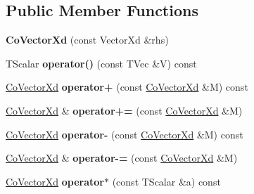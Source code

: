 \subsection*{Public Member Functions}
\begin{DoxyCompactItemize}
\item 
\hypertarget{struct_d_r_d_s_p_1_1_co_vector_xd_a1d667a92798aeb3cc7b41ef66651d6f1}{{\bfseries Co\-Vector\-Xd} (const Vector\-Xd \&rhs)}\label{struct_d_r_d_s_p_1_1_co_vector_xd_a1d667a92798aeb3cc7b41ef66651d6f1}

\item 
\hypertarget{struct_d_r_d_s_p_1_1_co_vector_xd_ab304698fb26798dcd9460a85a6bcc9f7}{T\-Scalar {\bfseries operator()} (const T\-Vec \&V) const }\label{struct_d_r_d_s_p_1_1_co_vector_xd_ab304698fb26798dcd9460a85a6bcc9f7}

\item 
\hypertarget{struct_d_r_d_s_p_1_1_co_vector_xd_ae9dd77d633e38cdae84184a43c767bb3}{\hyperlink{struct_d_r_d_s_p_1_1_co_vector_xd}{Co\-Vector\-Xd} {\bfseries operator+} (const \hyperlink{struct_d_r_d_s_p_1_1_co_vector_xd}{Co\-Vector\-Xd} \&M) const }\label{struct_d_r_d_s_p_1_1_co_vector_xd_ae9dd77d633e38cdae84184a43c767bb3}

\item 
\hypertarget{struct_d_r_d_s_p_1_1_co_vector_xd_a2faad7b1946d7865d18e33bb1fb428af}{\hyperlink{struct_d_r_d_s_p_1_1_co_vector_xd}{Co\-Vector\-Xd} \& {\bfseries operator+=} (const \hyperlink{struct_d_r_d_s_p_1_1_co_vector_xd}{Co\-Vector\-Xd} \&M)}\label{struct_d_r_d_s_p_1_1_co_vector_xd_a2faad7b1946d7865d18e33bb1fb428af}

\item 
\hypertarget{struct_d_r_d_s_p_1_1_co_vector_xd_abcd5f800b05247ba663358387f0250fe}{\hyperlink{struct_d_r_d_s_p_1_1_co_vector_xd}{Co\-Vector\-Xd} {\bfseries operator-\/} (const \hyperlink{struct_d_r_d_s_p_1_1_co_vector_xd}{Co\-Vector\-Xd} \&M) const }\label{struct_d_r_d_s_p_1_1_co_vector_xd_abcd5f800b05247ba663358387f0250fe}

\item 
\hypertarget{struct_d_r_d_s_p_1_1_co_vector_xd_a9e15856f1b9498956ac0baa8c695bd77}{\hyperlink{struct_d_r_d_s_p_1_1_co_vector_xd}{Co\-Vector\-Xd} \& {\bfseries operator-\/=} (const \hyperlink{struct_d_r_d_s_p_1_1_co_vector_xd}{Co\-Vector\-Xd} \&M)}\label{struct_d_r_d_s_p_1_1_co_vector_xd_a9e15856f1b9498956ac0baa8c695bd77}

\item 
\hypertarget{struct_d_r_d_s_p_1_1_co_vector_xd_a527f1752685e8b0115c2a45c8f743cc4}{\hyperlink{struct_d_r_d_s_p_1_1_co_vector_xd}{Co\-Vector\-Xd} {\bfseries operator$\ast$} (const T\-Scalar \&a) const }\label{struct_d_r_d_s_p_1_1_co_vector_xd_a527f1752685e8b0115c2a45c8f743cc4}


\end{DoxyCompactItemize}
